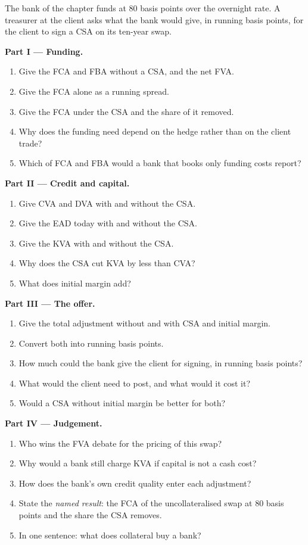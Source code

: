\begin{problem}\label{pb:rc:funding-margin-and-capital-adjustments:1}
The bank of the chapter funds at 80 basis points over the overnight rate. A treasurer at the
client asks what the bank would give, in running basis points, for the client to sign a CSA
on its ten-year swap.

\medskip\noindent\textbf{Part I --- Funding.}
\begin{enumerate}
\item Give the FCA and FBA without a CSA, and the net FVA.
\item Give the FCA alone as a running spread.
\item Give the FCA under the CSA and the share of it removed.
\item Why does the funding need depend on the hedge rather than on the client trade?
\item Which of FCA and FBA would a bank that books only funding costs report?
\end{enumerate}

\medskip\noindent\textbf{Part II --- Credit and capital.}
\begin{enumerate}[resume]
\item Give CVA and DVA with and without the CSA.
\item Give the EAD today with and without the CSA.
\item Give the KVA with and without the CSA.
\item Why does the CSA cut KVA by less than CVA?
\item What does initial margin add?
\end{enumerate}

\medskip\noindent\textbf{Part III --- The offer.}
\begin{enumerate}[resume]
\item Give the total adjustment without and with CSA and initial margin.
\item Convert both into running basis points.
\item How much could the bank give the client for signing, in running basis points?
\item What would the client need to post, and what would it cost it?
\item Would a CSA without initial margin be better for both?
\end{enumerate}

\medskip\noindent\textbf{Part IV --- Judgement.}
\begin{enumerate}[resume]
\item Who wins the FVA debate for the pricing of this swap?
\item Why would a bank still charge KVA if capital is not a cash cost?
\item How does the bank's own credit quality enter each adjustment?
\item State the \emph{named result}: the FCA of the uncollateralised swap at 80 basis points
and the share the CSA removes.
\item In one sentence: what does collateral buy a bank?
\end{enumerate}
\end{problem}

